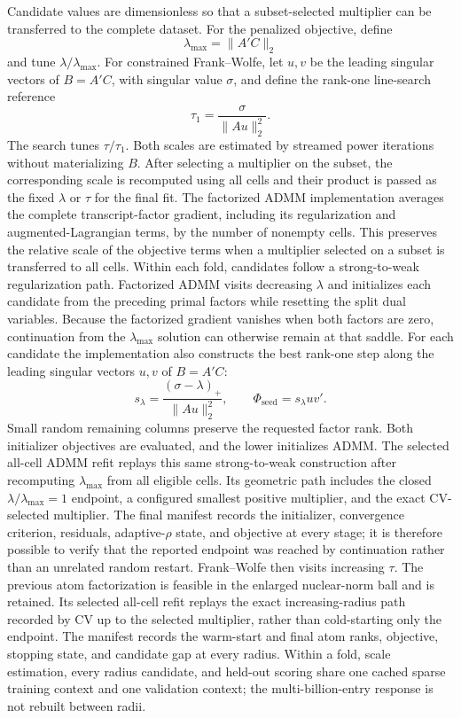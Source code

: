 \documentclass[11pt]{article}
\begin{document}
Candidate values are dimensionless so that a subset-selected multiplier can be
transferred to the complete dataset. For the penalized objective, define
\[
  \lambda_{\max}=\|A'C\|_2
\]
and tune \(\lambda/\lambda_{\max}\). For constrained Frank--Wolfe, let \(u,v\)
be the leading singular vectors of \(B=A'C\), with singular value \(\sigma\),
and define the rank-one line-search reference
\[
  \tau_1=\frac{\sigma}{\|Au\|_2^2}.
\]
The search tunes \(\tau/\tau_1\). Both scales are estimated by streamed power
iterations without materializing \(B\). After selecting a multiplier on the
subset, the corresponding scale is recomputed using all cells and their product
is passed as the fixed \(\lambda\) or \(\tau\) for the final fit.
The factorized ADMM implementation averages the complete transcript-factor
gradient, including its regularization and augmented-Lagrangian terms, by the
number of nonempty cells. This preserves the relative scale of the objective terms when a
multiplier selected on a subset is transferred to all cells. Within each fold,
candidates follow a strong-to-weak regularization path. Factorized ADMM visits
decreasing \(\lambda\) and initializes each candidate from the preceding primal
factors while resetting the split dual variables. Because the factorized
gradient vanishes when both factors are zero, continuation from the
\(\lambda_{\max}\) solution can otherwise remain at that saddle. For each
candidate the implementation also constructs the best rank-one step along the
leading singular vectors \(u,v\) of \(B=A'C\):
\[
  s_\lambda
  =
  \frac{(\sigma-\lambda)_+}{\lVert Au\rVert_2^2},
  \qquad
  \Phi_{\mathrm{seed}}=s_\lambda uv'.
\]
Small random remaining columns preserve the requested factor rank. Both
initializer objectives are evaluated, and the lower initializes ADMM. The
selected all-cell ADMM refit replays this same
strong-to-weak construction after recomputing \(\lambda_{\max}\) from all
eligible cells. Its geometric path includes the closed
\(\lambda/\lambda_{\max}=1\) endpoint, a configured smallest positive
multiplier, and the exact CV-selected multiplier. The final manifest records
the initializer, convergence criterion, residuals, adaptive-\(\rho\) state,
and objective at every stage; it is therefore possible to verify that the
reported endpoint was reached by continuation rather than an unrelated random
restart. Frank--Wolfe then visits increasing \(\tau\). The previous atom
factorization is feasible in the enlarged
nuclear-norm ball and is retained. Its selected all-cell refit replays the
exact increasing-radius path recorded by CV up to the selected multiplier,
rather than cold-starting only the endpoint. The manifest records the
warm-start and final atom ranks, objective, stopping state, and candidate gap
at every radius. Within a fold, scale estimation, every radius candidate, and
held-out scoring share one cached sparse training context and one validation
context; the multi-billion-entry response is not rebuilt between radii.
\end{document}
